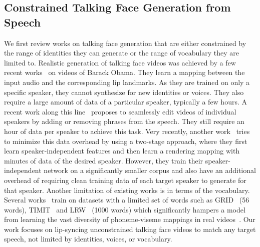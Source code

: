 \documentclass[sigconf]{acmart}
\begin{document}
\subsection{Constrained Talking Face Generation from Speech}
We first review works on talking face generation that are either constrained by the range of identities they can generate or the range of vocabulary they are limited to. Realistic generation of talking face videos was achieved by a few recent works~\cite{suwajanakorn2017synthesizing,kumar2017obamanet} on videos of Barack Obama. They learn a mapping between the input audio and the corresponding lip landmarks. As they are trained on only a specific speaker, they cannot synthesize for new identities or voices. They also require a large amount of data of a particular speaker, typically a few hours. A recent work along this line~\cite{fried2019text} proposes to seamlessly edit videos of individual speakers by adding or removing phrases from the speech. They still require an hour of data per speaker to achieve this task. Very recently, another work~\cite{thies2019neural} tries to minimize this data overhead by using a two-stage approach, where they first learn speaker-independent features and then learn a rendering mapping with  minutes of data of the desired speaker. However, they train their speaker-independent network on a significantly smaller corpus and also have an additional overhead of requiring clean training data of each target speaker to generate for that speaker. Another limitation of existing works is in terms of the vocabulary. Several works~\cite{zhou2018talking,vougioukas2019realistic,chen2019hierarchical} train on datasets with a limited set of words such as GRID~\cite{cooke2006audio} (56 words), TIMIT~\cite{harte2015tcd} and LRW~\cite{chung2016lip} (1000 words) which significantly hampers a model from learning the vast diversity of phoneme-viseme mappings in real videos~\cite{kr2019towards}. Our work focuses on lip-syncing unconstrained talking face videos to match any target speech, not limited by identities, voices, or vocabulary.
\end{document}
